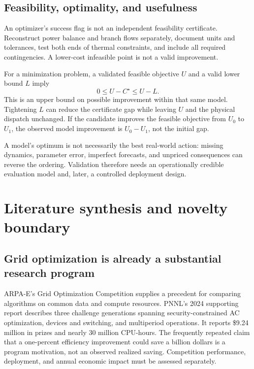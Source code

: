 \documentclass[11pt,letterpaper]{article}
\begin{document}
\subsection{Feasibility, optimality, and usefulness}
An optimizer's success flag is not an independent feasibility certificate. Reconstruct power balance and branch flows separately, document units and tolerances, test both ends of thermal constraints, and include all required contingencies. A lower-cost infeasible point is not a valid improvement.

For a minimization problem, a validated feasible objective $U$ and a valid lower bound $L$ imply
\begin{equation}
 0\le U-C^\star\le U-L.
 \label{eq:gap}
\end{equation}
This is an upper bound on possible improvement within that same model. Tightening $L$ can reduce the certificate gap while leaving $U$ and the physical dispatch unchanged. If the candidate improves the feasible objective from $U_0$ to $U_1$, the observed model improvement is $U_0-U_1$, not the initial gap.

A model's optimum is not necessarily the best real-world action: missing dynamics, parameter error, imperfect forecasts, and unpriced consequences can reverse the ordering. Validation therefore needs an operationally credible evaluation model and, later, a controlled deployment design.

\section{Literature synthesis and novelty boundary}
\label{sec:literature}
\subsection{Grid optimization is already a substantial research program}
ARPA-E's Grid Optimization Competition supplies a precedent for comparing algorithms on common data and compute resources. PNNL's 2024 supporting report describes three challenge generations spanning security-constrained AC optimization, devices and switching, and multiperiod operations. It reports \$9.24 million in prizes and nearly 30 million CPU-hours. The frequently repeated claim that a one-percent efficiency improvement could save a billion dollars is a program motivation, not an observed realized saving. Competition performance, deployment, and annual economic impact must be assessed separately.\cite{go}
\end{document}
